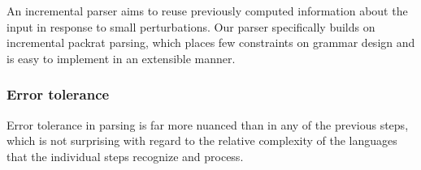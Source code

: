 An incremental parser aims to reuse previously computed information about the
input in response to small perturbations. Our parser specifically builds on
incremental packrat parsing\cite{dubroy2017incremental_packrat_parsing}, which
places few constraints on grammar design and is easy to implement in an
extensible manner.


\subsubsection*{Error tolerance}

Error tolerance in parsing is far more nuanced than in any of the previous
steps, which is not surprising with regard to the relative complexity of the
languages that the individual steps recognize and process.
